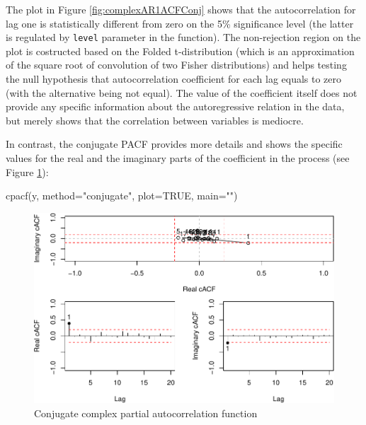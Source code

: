\documentclass[
]{book}
\newenvironment{Shaded}{\begin{snugshade}}{\end{snugshade}}
\newcommand{\AttributeTok}[1]{\textcolor[rgb]{0.77,0.63,0.00}{#1}}
\newcommand{\ConstantTok}[1]{\textcolor[rgb]{0.00,0.00,0.00}{#1}}
\newcommand{\FunctionTok}[1]{\textcolor[rgb]{0.00,0.00,0.00}{#1}}
\newcommand{\NormalTok}[1]{#1}
\newcommand{\StringTok}[1]{\textcolor[rgb]{0.31,0.60,0.02}{#1}}
\begin{document}
The plot in Figure \ref{fig:complexAR1ACFConj} shows that the autocorrelation for lag one is statistically different from zero on the 5\% significance level (the latter is regulated by \texttt{level} parameter in the function). The non-rejection region on the plot is costructed based on the Folded t-distribution (which is an approximation of the square root of convolution of two Fisher distributions) and helps testing the null hypothesis that autocorrelation coefficient for each lag equals to zero (with the alternative being not equal). The value of the coefficient itself does not provide any specific information about the autoregressive relation in the data, but merely shows that the correlation between variables is mediocre.

In contrast, the conjugate PACF provides more details and shows the specific values for the real and the imaginary parts of the coefficient in the process (see Figure \ref{fig:complexAR1PACFConj}):

\begin{Shaded}
\begin{Highlighting}[]
\FunctionTok{cpacf}\NormalTok{(y, }\AttributeTok{method=}\StringTok{"conjugate"}\NormalTok{, }\AttributeTok{plot=}\ConstantTok{TRUE}\NormalTok{, }\AttributeTok{main=}\StringTok{""}\NormalTok{)}
\end{Highlighting}
\end{Shaded}

\begin{figure}
\centering
\includegraphics{Svetunkov---Svetunkov---Complex-Valued-Econometrics_files/figure-latex/complexAR1PACFConj-1.pdf}
\caption{\label{fig:complexAR1PACFConj}Conjugate complex partial autocorrelation function}
\end{figure}
\end{document}
